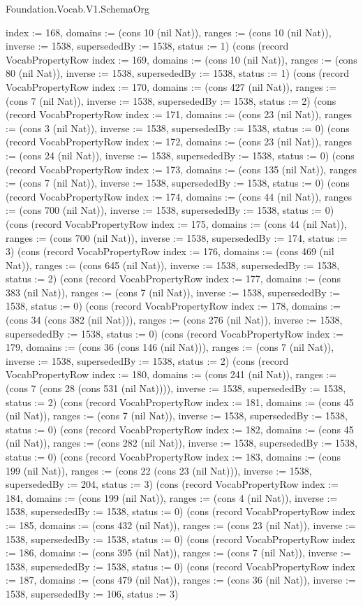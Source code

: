 \begin{lexlean}{Foundation.Vocab.V1.SchemaOrg}
\begin{semanticmodule}
{{index := 168, domains := (cons 10 (nil Nat)), ranges := (cons 10 (nil Nat)), inverse := 1538, supersededBy := 1538, status := 1}) (cons (record VocabPropertyRow {index := 169, domains := (cons 10 (nil Nat)), ranges := (cons 80 (nil Nat)), inverse := 1538, supersededBy := 1538, status := 1}) (cons (record VocabPropertyRow {index := 170, domains := (cons 427 (nil Nat)), ranges := (cons 7 (nil Nat)), inverse := 1538, supersededBy := 1538, status := 2}) (cons (record VocabPropertyRow {index := 171, domains := (cons 23 (nil Nat)), ranges := (cons 3 (nil Nat)), inverse := 1538, supersededBy := 1538, status := 0}) (cons (record VocabPropertyRow {index := 172, domains := (cons 23 (nil Nat)), ranges := (cons 24 (nil Nat)), inverse := 1538, supersededBy := 1538, status := 0}) (cons (record VocabPropertyRow {index := 173, domains := (cons 135 (nil Nat)), ranges := (cons 7 (nil Nat)), inverse := 1538, supersededBy := 1538, status := 0}) (cons (record VocabPropertyRow {index := 174, domains := (cons 44 (nil Nat)), ranges := (cons 700 (nil Nat)), inverse := 1538, supersededBy := 1538, status := 0}) (cons (record VocabPropertyRow {index := 175, domains := (cons 44 (nil Nat)), ranges := (cons 700 (nil Nat)), inverse := 1538, supersededBy := 174, status := 3}) (cons (record VocabPropertyRow {index := 176, domains := (cons 469 (nil Nat)), ranges := (cons 645 (nil Nat)), inverse := 1538, supersededBy := 1538, status := 2}) (cons (record VocabPropertyRow {index := 177, domains := (cons 383 (nil Nat)), ranges := (cons 7 (nil Nat)), inverse := 1538, supersededBy := 1538, status := 0}) (cons (record VocabPropertyRow {index := 178, domains := (cons 34 (cons 382 (nil Nat))), ranges := (cons 276 (nil Nat)), inverse := 1538, supersededBy := 1538, status := 0}) (cons (record VocabPropertyRow {index := 179, domains := (cons 36 (cons 146 (nil Nat))), ranges := (cons 7 (nil Nat)), inverse := 1538, supersededBy := 1538, status := 2}) (cons (record VocabPropertyRow {index := 180, domains := (cons 241 (nil Nat)), ranges := (cons 7 (cons 28 (cons 531 (nil Nat)))), inverse := 1538, supersededBy := 1538, status := 2}) (cons (record VocabPropertyRow {index := 181, domains := (cons 45 (nil Nat)), ranges := (cons 7 (nil Nat)), inverse := 1538, supersededBy := 1538, status := 0}) (cons (record VocabPropertyRow {index := 182, domains := (cons 45 (nil Nat)), ranges := (cons 282 (nil Nat)), inverse := 1538, supersededBy := 1538, status := 0}) (cons (record VocabPropertyRow {index := 183, domains := (cons 199 (nil Nat)), ranges := (cons 22 (cons 23 (nil Nat))), inverse := 1538, supersededBy := 204, status := 3}) (cons (record VocabPropertyRow {index := 184, domains := (cons 199 (nil Nat)), ranges := (cons 4 (nil Nat)), inverse := 1538, supersededBy := 1538, status := 0}) (cons (record VocabPropertyRow {index := 185, domains := (cons 432 (nil Nat)), ranges := (cons 23 (nil Nat)), inverse := 1538, supersededBy := 1538, status := 0}) (cons (record VocabPropertyRow {index := 186, domains := (cons 395 (nil Nat)), ranges := (cons 7 (nil Nat)), inverse := 1538, supersededBy := 1538, status := 0}) (cons (record VocabPropertyRow {index := 187, domains := (cons 479 (nil Nat)), ranges := (cons 36 (nil Nat)), inverse := 1538, supersededBy := 106, status := 3}) }
\end{semanticmodule}
\end{lexlean}
